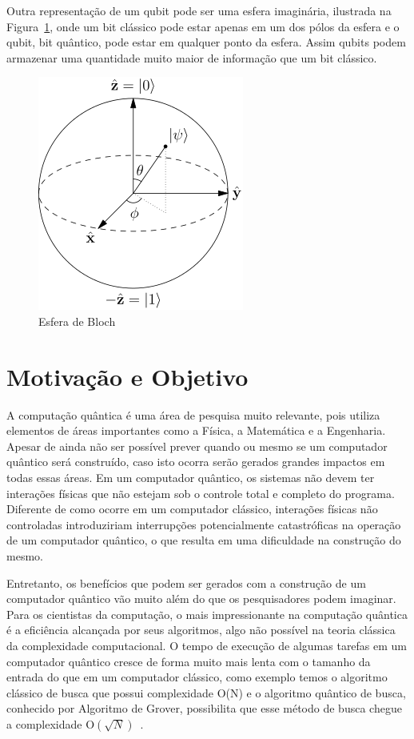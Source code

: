 \documentclass[a4paper, 12pt, oneside]{book}
\begin{document}
Outra representação de um qubit pode ser uma esfera imaginária, ilustrada na Figura~\ref{fig:bloch}, onde um bit clássico pode estar apenas em um dos pólos da esfera e o qubit, bit quântico, pode estar em qualquer ponto da esfera. Assim qubits podem armazenar uma quantidade muito maior de informação que um bit clássico.

\begin{figure}[H]
\centering
\includegraphics[scale=0.5]{bloch_sphere.png}
\caption{Esfera de Bloch}
\label{fig:bloch}
\end{figure}

\section{Motivação e Objetivo}

A computação quântica é uma área de pesquisa muito relevante, pois utiliza elementos de áreas importantes como a Física, a Matemática e a Engenharia. Apesar de ainda não ser possível prever quando ou mesmo se um computador quântico será construído, caso isto ocorra serão gerados grandes impactos em todas essas áreas. Em um computador quântico, os sistemas não devem ter interações físicas que não estejam sob o controle total e completo do programa. Diferente de como ocorre em um computador clássico, interações físicas não controladas introduziriam interrupções potencialmente catastróficas na operação de um computador quântico, o que resulta em uma dificuldade na construção do mesmo. 

Entretanto, os benefícios que podem ser gerados com a construção de um computador quântico vão muito além do que os pesquisadores podem imaginar. Para os cientistas da computação, o mais impressionante na computação quântica é a eficiência alcançada por seus algoritmos, algo não possível na teoria clássica da complexidade computacional. O tempo de execução de algumas tarefas em um computador quântico cresce de forma muito mais lenta com o tamanho da entrada do que em um computador clássico, como exemplo temos o algoritmo clássico de busca que possui complexidade O(N) e o algoritmo quântico de busca, conhecido por Algoritmo de Grover, possibilita que esse método de busca chegue a complexidade O$(\sqrt{N})$~\cite{grover}. 
\end{document}
